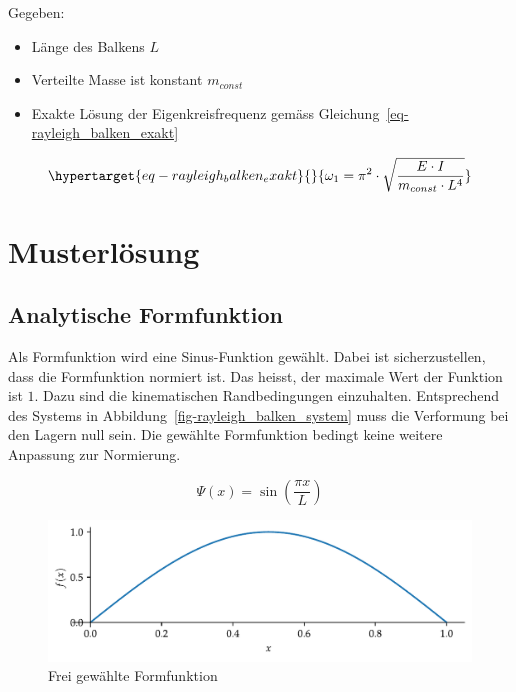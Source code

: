 \documentclass[
  letterpaper,
  DIV=11]{scrreprt}
\providecommand{\tightlist}{%
  \setlength{\itemsep}{0pt}\setlength{\parskip}{0pt}}\usepackage{longtable,booktabs,array}
\begin{document}
Gegeben:

\begin{itemize}
\tightlist
\item
  Länge des Balkens \(L\)
\item
  Verteilte Masse ist konstant \(m_{const}\)
\item
  Exakte Lösung der Eigenkreisfrequenz gemäss
  Gleichung~\ref{eq-rayleigh_balken_exakt}
\end{itemize}

\begin{equation}\protect\hypertarget{eq-rayleigh_balken_exakt}{}{
\omega_1 = \pi^2 \cdot \sqrt{\frac{E\cdot I}{m_{const}\cdot L^4}}
}\label{eq-rayleigh_balken_exakt}\end{equation}

\newpage{}

\hypertarget{musterluxf6sung-1}{%
\section{Musterlösung}\label{musterluxf6sung-1}}

\hypertarget{analytische-formfunktion}{%
\subsection{Analytische Formfunktion}\label{analytische-formfunktion}}

Als Formfunktion wird eine Sinus-Funktion gewählt. Dabei ist
sicherzustellen, dass die Formfunktion normiert ist. Das heisst, der
maximale Wert der Funktion ist \(1\). Dazu sind die kinematischen
Randbedingungen einzuhalten. Entsprechend des Systems in
Abbildung~\ref{fig-rayleigh_balken_system} muss die Verformung bei den
Lagern null sein. Die gewählte Formfunktion bedingt keine weitere
Anpassung zur Normierung.

\begin{equation}\Psi{\left(x \right)} = \sin{\left(\frac{\pi x}{L} \right)}\end{equation}

\begin{figure}[H]

{\centering \includegraphics{index_files/mediabag/rayleigh_03_files/figure-pdf/fig-formfunktion-output-1.pdf}

}

\caption{\label{fig-formfunktion}Frei gewählte Formfunktion}

\end{figure}
\end{document}
